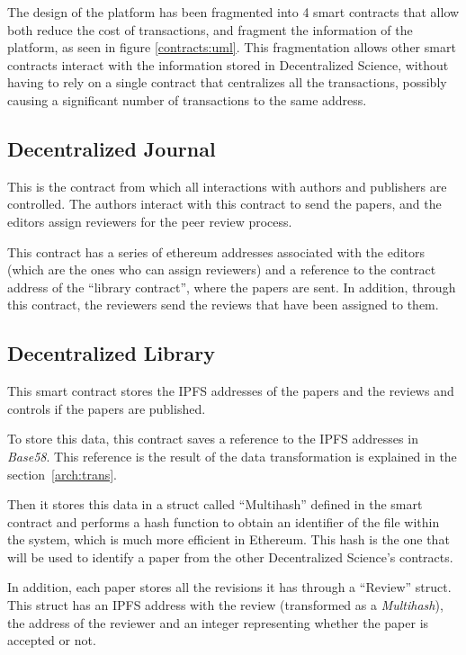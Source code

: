 
The design of the platform has been fragmented into 4 smart contracts that allow
both reduce the cost of transactions, and fragment the information of the
platform, as seen in figure \ref{contracts:uml}. This fragmentation allows other
smart contracts interact with the information stored in Decentralized Science,
without having to rely on a single contract that centralizes all the
transactions, possibly causing a significant number of transactions to the same
address.

\subsection*{Decentralized Journal}%

This is the contract from which all interactions with authors and publishers are
controlled. The authors interact with this contract to send the papers, and the
editors assign reviewers for the peer review process.

This contract has a series of ethereum addresses associated with the editors
(which are the ones who can assign reviewers) and a reference to the contract
address of the ``library contract'', where the papers are sent. In addition,
through this contract, the reviewers send the reviews that have been assigned to
them.

\subsection*{Decentralized Library}

This smart contract stores the IPFS addresses of the papers and the reviews and
controls if the papers are published.

To store this data, this contract saves a reference to the IPFS addresses in
\emph{Base58}. This reference is the result of the data transformation is
explained in the section~\ref{arch:trans}.

Then it stores this data in a struct called ``Multihash'' defined in the smart
contract and performs a hash function to obtain an identifier of the file within
the system, which is much more efficient in Ethereum. This hash is the one that
will be used to identify a paper from the other Decentralized
Science's contracts.

In addition, each paper stores all the revisions it has through a ``Review''
struct. This struct has an IPFS address with the review (transformed as a
\emph{Multihash}), the address of the reviewer and an integer representing
whether the paper is accepted or not.

